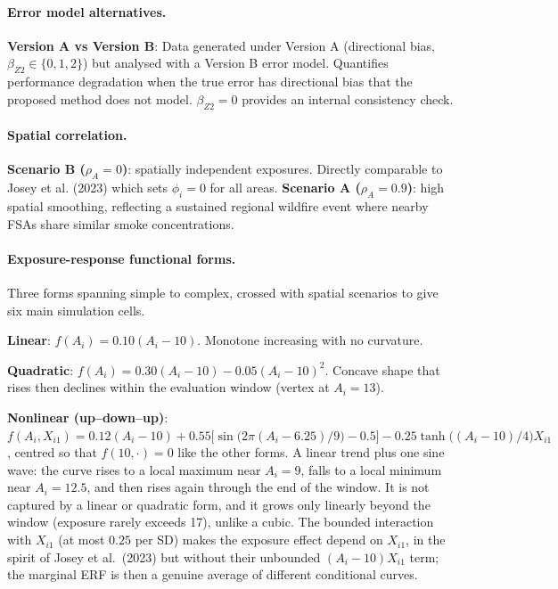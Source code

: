\documentclass[11pt]{article}
\begin{document}
\paragraph{Error model alternatives.}
\textbf{Version A vs Version B}: Data generated under Version A (directional bias,
$\beta_{Z2} \in \{0, 1, 2\}$) but analysed with a Version B error model. Quantifies
performance degradation when the true error has directional bias that the proposed method
does not model. $\beta_{Z2} = 0$ provides an internal consistency check.

\paragraph{Spatial correlation.}
\textbf{Scenario B ($\rho_A = 0$)}: spatially independent exposures. Directly comparable
to Josey et al. (2023) which sets $\phi_i = 0$ for all areas.
\textbf{Scenario A ($\rho_A = 0.9$)}: high spatial smoothing, reflecting a sustained
regional wildfire event where nearby FSAs share similar smoke concentrations.

\paragraph{Exposure-response functional forms.}
Three forms spanning simple to complex, crossed with spatial scenarios to give six
main simulation cells.

\textbf{Linear}: $f(A_i) = 0.10(A_i - 10)$.
Monotone increasing with no curvature.

\textbf{Quadratic}: $f(A_i) = 0.30(A_i - 10) - 0.05(A_i - 10)^2$.
Concave shape that rises then declines within the evaluation window (vertex at $A_i=13$).

\textbf{Nonlinear (up--down--up)}: $f(A_i, X_{i1}) = 0.12(A_i - 10) + 0.55\big[\sin\!\big(2\pi(A_i - 6.25)/9\big) - 0.5\big] - 0.25\tanh\!\big((A_i - 10)/4\big)X_{i1}$, centred so that $f(10, \cdot) = 0$ like the other forms.
A linear trend plus one sine wave: the curve rises to a local maximum near $A_i = 9$, falls to a
local minimum near $A_i = 12.5$, and then rises again through the end of the window. It is not
captured by a linear or quadratic form, and it grows only linearly beyond the window (exposure
rarely exceeds 17), unlike a cubic. The bounded interaction with $X_{i1}$ (at most $0.25$ per SD)
makes the exposure effect depend on $X_{i1}$, in the spirit of Josey et al.\ (2023) but without their
unbounded $(A_i - 10)X_{i1}$ term; the marginal ERF is then a genuine average of different
conditional curves.
\end{document}
